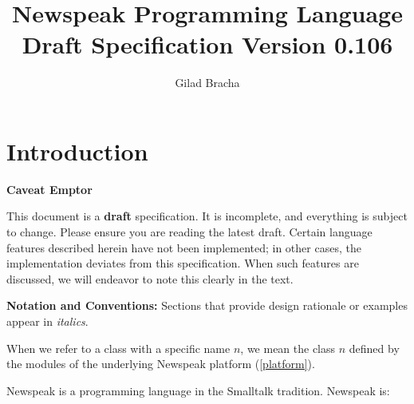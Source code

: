 \documentclass{article}
\title{Newspeak Programming Language Draft Specification Version 0.106}
\author{Gilad Bracha}
\begin{document}
\maketitle
\tableofcontents

\section{Introduction}

{\em

 {\bf Caveat Emptor}
 
This document is a {\bf  draft} specification. It is incomplete, and everything is subject to change. Please ensure you are reading the latest draft. Certain language features described herein have not been implemented; in other cases, the implementation deviates from this specification. When such features are discussed, we will endeavor to note this clearly in the text.

}


{\bf Notation and Conventions:} Sections that provide design rationale or examples appear in {\em italics}. 

When we refer to a class with a specific name $n$, we mean the class $n$ defined by the modules of the underlying Newspeak platform (\ref{platform}).

Newspeak is a programming language in the Smalltalk \cite{GoldbergRobson83} tradition.  
Newspeak is:
\end{document}
